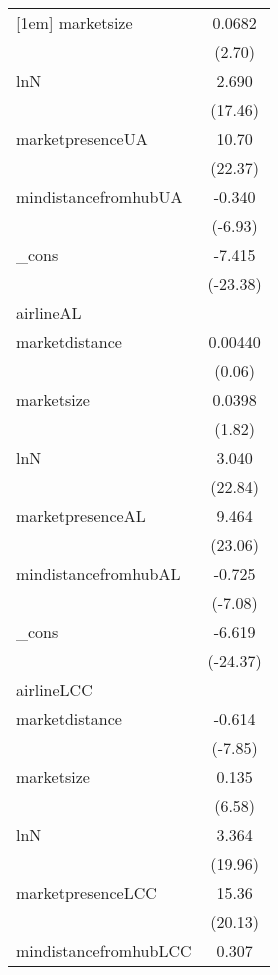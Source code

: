 {\begin{tabular}{l*{1}{c}}
[1em]
marketsize  &      0.0682\sym{**} \\
            &      (2.70)         \\
[1em]
lnN         &       2.690\sym{***}\\
            &     (17.46)         \\
[1em]
marketpresenceUA&       10.70\sym{***}\\
            &     (22.37)         \\
[1em]
mindistancefromhubUA&      -0.340\sym{***}\\
            &     (-6.93)         \\
[1em]
\_cons      &      -7.415\sym{***}\\
            &    (-23.38)         \\
\hline
airlineAL   &                     \\
marketdistance&     0.00440         \\
            &      (0.06)         \\
[1em]
marketsize  &      0.0398         \\
            &      (1.82)         \\
[1em]
lnN         &       3.040\sym{***}\\
            &     (22.84)         \\
[1em]
marketpresenceAL&       9.464\sym{***}\\
            &     (23.06)         \\
[1em]
mindistancefromhubAL&      -0.725\sym{***}\\
            &     (-7.08)         \\
[1em]
\_cons      &      -6.619\sym{***}\\
            &    (-24.37)         \\
\hline
airlineLCC  &                     \\
marketdistance&      -0.614\sym{***}\\
            &     (-7.85)         \\
[1em]
marketsize  &       0.135\sym{***}\\
            &      (6.58)         \\
[1em]
lnN         &       3.364\sym{***}\\
            &     (19.96)         \\
[1em]
marketpresenceLCC&       15.36\sym{***}\\
            &     (20.13)         \\
[1em]
mindistancefromhubLCC&       0.307         \\

\end{tabular}}
